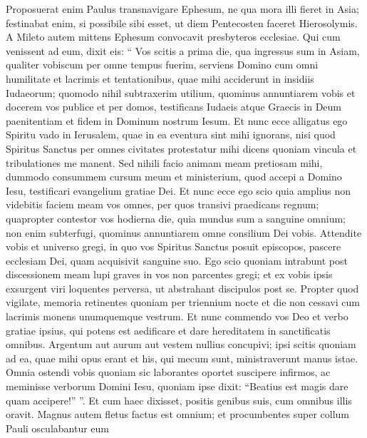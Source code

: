 \begin{biblechapter}
\begin{biblechapter}
\begin{biblechapter}
\begin{biblechapter}
\begin{biblechapter}
\begin{biblechapter}
\begin{biblechapter}
\begin{biblechapter}
\begin{biblechapter}
\begin{biblechapter}
\begin{biblechapter}
\begin{biblechapter}
\begin{biblechapter}
\begin{biblechapter}
\begin{biblechapter}
\begin{biblechapter}
\begin{biblechapter}
\begin{biblechapter}
\begin{biblechapter}
\begin{biblechapter}
\verse Proposuerat enim Paulus transnavigare Ephesum, ne qua mora illi fieret in Asia; festinabat enim, si possibile sibi esset, ut diem Pentecosten faceret Hierosolymis.
 \verse A Mileto autem mittens Ephesum convocavit presbyteros ecclesiae. 
\verse Qui cum venissent ad eum, dixit eis: “ Vos scitis a prima die, qua ingressus sum in Asiam, qualiter vobiscum per omne tempus fuerim, 
\verse serviens Domino cum omni humilitate et lacrimis et tentationibus, quae mihi acciderunt in insidiis Iudaeorum; 
\verse quomodo nihil subtraxerim utilium, quominus annuntiarem vobis et docerem vos publice et per domos, 
\verse testificans Iudaeis atque Graecis in Deum paenitentiam et fidem in Dominum nostrum Iesum. 
\verse Et nunc ecce alligatus ego Spiritu vado in Ierusalem, quae in ea eventura sint mihi ignorans, 
 \verse nisi quod Spiritus Sanctus per omnes civitates protestatur mihi dicens quoniam vincula et tribulationes me manent. 
\verse Sed nihili facio animam meam pretiosam mihi, dummodo consummem cursum meum et ministerium, quod accepi a Domino Iesu, testificari evangelium gratiae Dei.
 \verse Et nunc ecce ego scio quia amplius non videbitis faciem meam vos omnes, per quos transivi praedicans regnum; 
\verse quapropter contestor vos hodierna die, quia mundus sum a sanguine omnium; 
\verse non enim subterfugi, quominus annuntiarem omne consilium Dei vobis. 
\verse Attendite vobis et universo gregi, in quo vos Spiritus Sanctus posuit episcopos, pascere ecclesiam Dei, quam acquisivit sanguine suo. 
\verse Ego scio quoniam intrabunt post discessionem meam lupi graves in vos non parcentes gregi; 
\verse et ex vobis ipsis exsurgent viri loquentes perversa, ut abstrahant discipulos post se. 
\verse Propter quod vigilate, memoria retinentes quoniam per triennium nocte et die non cessavi cum lacrimis monens unumquemque vestrum.
 \verse Et nunc commendo vos Deo et verbo gratiae ipsius, qui potens est aedificare et dare hereditatem in sanctificatis omnibus. 
\verse Argentum aut aurum aut vestem nullius concupivi; 
\verse ipsi scitis quoniam ad ea, quae mihi opus erant et his, qui mecum sunt, ministraverunt manus istae. 
\verse Omnia ostendi vobis quoniam sic laborantes oportet suscipere infirmos, ac meminisse verborum Domini Iesu, quoniam ipse dixit: “Beatius est magis dare quam accipere!” ”.
 \verse Et cum haec dixisset, positis genibus suis, cum omnibus illis oravit. 
\verse Magnus autem fletus factus est omnium; et procumbentes super collum Pauli osculabantur eum 

\end{biblechapter}
\end{biblechapter}
\end{biblechapter}
\end{biblechapter}
\end{biblechapter}
\end{biblechapter}
\end{biblechapter}
\end{biblechapter}
\end{biblechapter}
\end{biblechapter}
\end{biblechapter}
\end{biblechapter}
\end{biblechapter}
\end{biblechapter}
\end{biblechapter}
\end{biblechapter}
\end{biblechapter}
\end{biblechapter}
\end{biblechapter}
\end{biblechapter}
